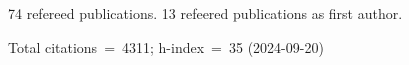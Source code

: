 74 refereed publications. 13 refeered publications as first author.

Total citations~=~4311; h-index~=~35 (2024-09-20)